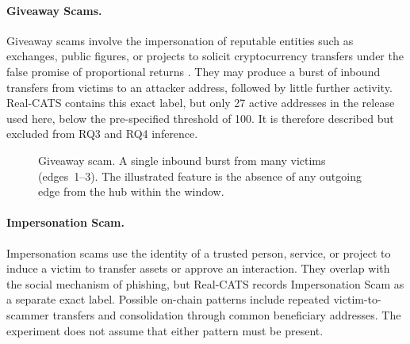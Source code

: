 \paragraph{Giveaway Scams.}
Giveaway scams involve the impersonation of reputable entities such as exchanges, public figures, or projects to solicit cryptocurrency transfers under the false promise of proportional returns \citep{hornuf2025cybercrime}. They may produce a burst of inbound transfers from victims to an attacker address, followed by little further activity. Real-CATS contains this exact label, but only 27 active addresses in the release used here, below the pre-specified threshold of 100. It is therefore described but excluded from RQ3 and RQ4 inference.

\begin{figure}[ht]
  \centering
  \caption[Giveaway transfer sequence]{Giveaway scam. A single inbound burst from
    many victims (edges~1--3). The illustrated feature is the absence of any
    outgoing edge from the hub within the window.}
  \label{fig:motif-giveaway}
\end{figure}

\paragraph{Impersonation Scam.}
Impersonation scams use the identity of a trusted person, service, or project to
induce a victim to transfer assets or approve an interaction. They overlap with
the social mechanism of phishing, but Real-CATS records Impersonation Scam as a
separate exact label. Possible on-chain patterns include repeated victim-to-scammer
transfers and consolidation through common beneficiary addresses. The experiment
does not assume that either pattern must be present.

